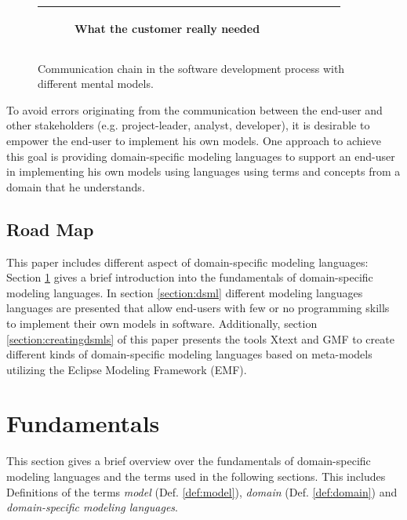 \documentclass[runningheads,a4paper]{llncs}
\begin{document}
\begin{figure}[h]
\begin{center}
\begin{tabular}{|c|c|c|c|c|}
\begin{subfigure}[t]{0.15\textwidth}
\caption*{\tiny \centering What the customer really needed}\label{fig:whatneeded}\end{subfigure}\\
\hline
\end{tabular}
\caption{Communication chain in the software development process with different mental models.}
\label{fig:swingexample}
\end{center}
\end{figure}
To avoid errors originating from the communication between the end-user and other stakeholders (e.g. project-leader, analyst, developer), 
it is desirable to empower the end-user to implement his own models. 
One approach to achieve this goal is providing domain-specific modeling languages to support an 
end-user in implementing his own models using languages using terms and concepts from a domain that he understands.

\subsection{Road Map}
This paper includes different aspect of domain-specific modeling languages:
Section \ref{section:fundamentals} gives a brief introduction into the fundamentals of domain-specific modeling languages.
In section \ref{section:dsml} different  modeling languages languages are presented that allow end-users with few or no
programming skills to implement their own models in software.
Additionally, section \ref{section:creatingdsmls} of this paper presents the tools Xtext and GMF to create different kinds of domain-specific modeling languages
based on meta-models utilizing the Eclipse Modeling Framework (EMF).


\section{Fundamentals}
\label{section:fundamentals}
This section gives a brief overview over the fundamentals of domain-specific modeling languages 
and the terms used in the following sections. This includes Definitions of the terms \emph{model} (Def. \ref{def:model}), 
\emph{domain} (Def. \ref{def:domain}) and \emph{domain-specific modeling languages}.
\end{document}
